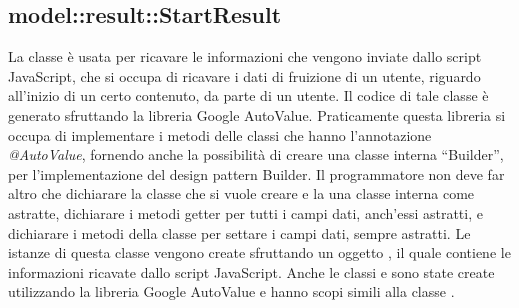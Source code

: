 \documentclass[../Tesi.tex]{subfiles}
\begin{document}
		\subsection{model::result::StartResult}
		La classe  è usata per ricavare le informazioni che vengono inviate dallo script JavaScript, che si occupa di ricavare i dati di fruizione di un utente, riguardo all'inizio di un certo contenuto, da parte di un utente. Il codice di tale classe è generato sfruttando la libreria Google AutoValue. Praticamente questa libreria si occupa di implementare i metodi delle classi che hanno l'annotazione \textit{@AutoValue}, fornendo anche la possibilità di creare una classe interna ``Builder'', per l'implementazione del design pattern Builder. Il programmatore non deve far altro che dichiarare la classe che si vuole creare e la una classe interna  come astratte, dichiarare i metodi getter per tutti i campi dati, anch'essi astratti, e dichiarare i metodi della classe  per settare i campi dati, sempre astratti. Le istanze di questa classe vengono create sfruttando un oggetto , il quale contiene le informazioni ricavate dallo script JavaScript. Anche le classi  e  sono state create utilizzando la libreria Google AutoValue e hanno scopi simili alla classe .
\end{document}
